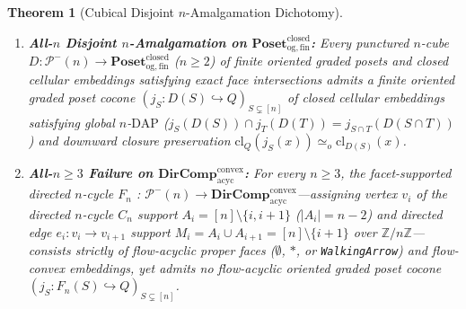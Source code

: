 \documentclass[10pt,twoside,openright]{book}
\theoremstyle{crmplain}
\newtheorem{theorem}{Theorem}[section]
\theoremstyle{crmdef}
\theoremstyle{crmremark}
\newcommand{\lean}[1]{\ignorespaces}
\newcommand{\leanok}{\ignorespaces}
\begin{document}
\begin{theorem}[Cubical Disjoint $n$-Amalgamation Dichotomy]\label{thm:directed-cubical-amalgamation}%
\lean{HomotopyCRM.IsCoveringGraded, HomotopyCRM.cubical_ndap_closed_oriented_poset, HomotopyCRM.isCoveringGraded_cubicalAmalgam, HomotopyCRM.instFintypeCubicalAmalgam, HomotopyCRM.facetCycleDiagram_isIntersective, HomotopyCRM.FacetCycleFace.isCoveringGraded_facetCycleFace, HomotopyCRM.facetCycleFace_isFlowAcyclic, HomotopyCRM.FacetCycleFace.facetCycleFace_classification, HomotopyCRM.facetCycleMap_isFlowConvex, HomotopyCRM.no_flowAcyclic_cubical_amalgam_of_three_le, HomotopyCRM.theorem10B_cubical_amalgamation_dichotomy}%
\leanok%
%
\leavevmode
\begin{enumerate}[label=(\arabic*),leftmargin=2em]
  \item \textbf{All-$n$ Disjoint $n$-Amalgamation on $\mathbf{Poset}_{\mathrm{og,fin}}^{\mathrm{closed}}$:} Every punctured $n$-cube $D : \mathcal{P}^-(n) \to \mathbf{Poset}_{\mathrm{og,fin}}^{\mathrm{closed}}$ ($n \ge 2$) of finite oriented graded posets and closed cellular embeddings satisfying exact face intersections admits a finite oriented graded poset cocone $(j_S : D(S) \hookrightarrow Q)_{S \subsetneq [n]}$ of closed cellular embeddings satisfying global $n$-$\mathrm{DAP}$ ($j_S(D(S)) \cap j_T(D(T)) = j_{S \cap T}(D(S \cap T))$) and downward closure preservation $\mathrm{cl}_Q(j_S(x)) \simeq_o \mathrm{cl}_{D(S)}(x)$.
  \item \textbf{All-$n \ge 3$ Failure on $\mathbf{DirComp}_{\mathrm{acyc}}^{\mathrm{convex}}$:} For every $n \ge 3$, the facet-supported directed $n$-cycle $F_n$ : $\mathcal{P}^-(n) \to \mathbf{DirComp}_{\mathrm{acyc}}^{\mathrm{convex}}$---assigning vertex $v_i$ of the directed $n$-cycle $C_n$ support $A_i = [n] \setminus \{i, i+1\}$ ($|A_i| = n - 2$) and directed edge $e_i : v_i \to v_{i+1}$ support $M_i = A_i \cup A_{i+1} = [n] \setminus \{i+1\}$ over $\mathbb{Z}/n\mathbb{Z}$---consists strictly of flow-acyclic proper faces ($\emptyset$, $*$, or \texttt{WalkingArrow}) and flow-convex embeddings, yet admits \emph{no} flow-acyclic oriented graded poset cocone $(j_S : F_n(S) \hookrightarrow Q)_{S \subsetneq [n]}$.
\end{enumerate}
\end{theorem}
\end{document}
